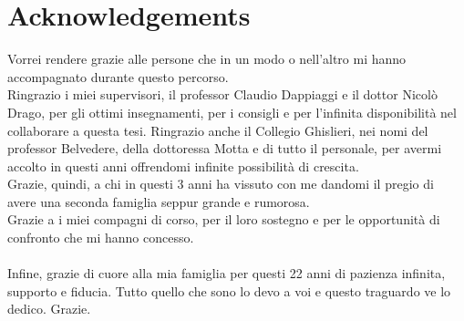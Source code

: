 \chapter{Acknowledgements}

Vorrei rendere grazie alle persone che in un modo o nell'altro mi hanno
accompagnato durante questo percorso.\\
Ringrazio i miei supervisori, il professor Claudio Dappiaggi e il dottor Nicolò Drago, per gli ottimi insegnamenti, per i
consigli e per l'infinita disponibilità nel collaborare a questa tesi.
Ringrazio anche il Collegio Ghislieri, nei nomi del professor Belvedere, della dottoressa
Motta e di tutto il personale, per avermi accolto in questi anni offrendomi infinite possibilità
di crescita.\\
Grazie, quindi, a chi in questi 3 anni ha vissuto con me dandomi il pregio di avere una
seconda famiglia seppur grande e rumorosa.\\
Grazie a i miei compagni di corso, per il loro sostegno e per le opportunità di confronto che mi hanno concesso.\\ \\

Infine, grazie di cuore alla mia famiglia per questi 22 anni di pazienza infinita, supporto e
fiducia. Tutto quello che sono lo devo a voi e questo traguardo ve lo dedico. Grazie.